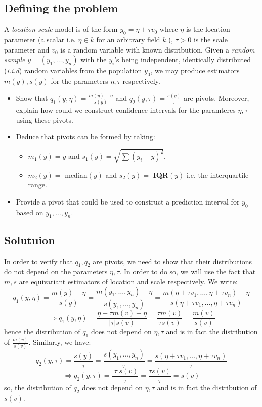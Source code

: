 \subsection{Defining the problem}
A \textit{location-scale} model is of the form $y_0 = \eta + \tau v_0$ where $\eta$ is the location parameter (a scalar i.e. $\eta \in k$ for an arbitrary field $k$.), $\tau > 0$ is the scale parameter and $v_0$ is a random variable with known distribution.
Given a \textit{random sample} $y = (y_1, \ldots, y_n)$ with the $y_i$'s being independent, identically distributed (\textit{i.i.d}) random variables from the population $y_0$, we may produce estimators $m(y), s(y)$ for the parameters $\eta, \tau$ respectively.

\vspace{0.2cm}

\begin{itemize}
    \item Show that $q_1(y, \eta) = \frac{m(y) - \eta}{s(y)}$ and $q_2(y, \tau) = \frac{s(y)}{\tau}$ are pivots. Moreover, explain how could we construct confidence intervals for the paramteres $\eta, \tau$ using these pivots.
    \item Deduce that pivots can be formed by taking:
    \begin{itemize}
        \item $m_1(y) = \bar{y}$ and $s_1(y) = \sqrt{\sum (y_i - \bar{y})^2}$.
        \item $m_2(y) = $ median$(y)$ and $s_2(y) = $ \textbf{IQR}$(y)$ i.e. the interquartile range.
    \end{itemize}
    \item Provide a pivot that could be used to construct a prediction interval for $y_0$ based on $y_1, \ldots, y_n$.
\end{itemize}

\subsection{Solutuion}
In order to verify that $q_1, q_2$ are pivots, we need to show that their distributions do not depend on the parameters $\eta, \tau$. In order to do so, we will use the fact that $m, s$ are equivariant estimators of location and scale respectively. We write:
$$q_1(y, \eta) = \frac{m(y) - \eta}{s(y)} = \frac{m(y_1, \ldots, y_n) - \eta}{s(y_1, \ldots, y_n)} = \frac{m(\eta + \tau v_1, \ldots, \eta + \tau v_n) - \eta}{s(\eta + \tau v_1, \ldots, \eta + \tau v_n)}$$
$$\Rightarrow q_1(y, \eta) = \frac{\eta + \tau m(v) -\eta}{|\tau| s(v)} = \frac{\tau m(v)}{\tau s(v)} = \frac{m(v)}{s(v)}$$
hence the distribution of $q_1$ does not depend on $\eta, \tau$ and is in fact the distribution of $\frac{m(v)}{s(v)}$. Similarly, we have:
$$q_2(y, \tau) = \frac{s(y)}{\tau} = \frac{s(y_1, \ldots, y_n)}{\tau} = \frac{s(\eta + \tau v_1, \ldots, \eta + \tau v_n)}{\tau}$$
$$\Rightarrow q_2(y, \tau) = \frac{|\tau| s(v)}{\tau} = \frac{\tau s(v)}{\tau} = s(v)$$
so, the distribution of $q_2$ does not depend on $\eta, \tau$ and is in fact the distribution of $s(v)$.


